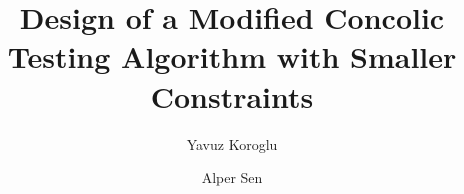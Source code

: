 \documentclass[EPiCempty]{easychair}
\begin{document}






%

\title{Design of a Modified Concolic Testing Algorithm with Smaller Constraints}
%
%
%
%
%

%
\author{
Yavuz Koroglu
\and
Alper Sen
}
\end{document}
